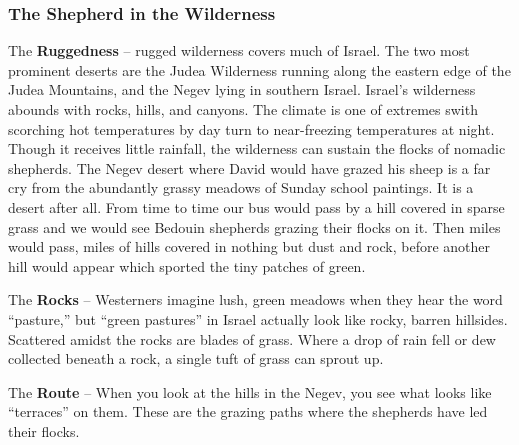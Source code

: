 \subsubsection{The Shepherd in the Wilderness}


\begin{compactenum}[I.]
    \item The \textbf{Ruggedness} -- rugged wilderness covers much of Israel. The two most prominent deserts are the Judea Wilderness running along the eastern edge of the Judea Mountains, and the Negev lying in southern Israel. Israel's wilderness abounds with rocks, hills, and canyons. The climate is one of extremes swith scorching hot temperatures by day turn to near-freezing temperatures at night. Though it receives little rainfall, the wilderness can sustain the flocks of nomadic shepherds. The Negev desert where David would have grazed his sheep is a far cry from the abundantly grassy meadows of Sunday school paintings. It is a desert after all. From time to time our bus would pass by a hill covered in sparse grass and we would see Bedouin shepherds grazing their flocks on it. Then miles would pass, miles of hills covered in nothing but dust and rock, before another hill would appear which sported the tiny patches of green.
	\item The \textbf{Rocks} -- Westerners imagine lush, green meadows when they hear the word ``pasture,'' but ``green pastures'' in Israel actually look like rocky, barren hillsides. Scattered amidst the rocks are blades of grass. Where a drop of rain fell or dew collected beneath a rock, a single tuft of grass can sprout up. %
    \item The \textbf{Route} -- When you look at the hills in the Negev, you see what looks like ``terraces'' on them.  These are the grazing paths where the shepherds have led their flocks.

\end{compactenum}
